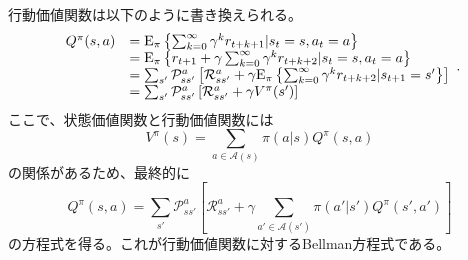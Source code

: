 \documentclass[dvipdfmx, 9pt, a4paper]{jsarticle}
\numberwithin{equation}{section}
\begin{document}
行動価値関数は以下のように書き換えられる。
\begin{equation}
\begin{array}{ll}
Q^\pi(s, a)&={\rm E}_\pi\left\{ \sum_{k=0}^\infty \gamma^kr_{t+k+1}|s_t=s, a_t=a \right\} \\
 & = {\rm E}_\pi\left\{ r_{t+1} + \gamma\sum_{k=0}^\infty \gamma^kr_{t+k+2}|s_t=s, a_t=a \right\} \\
 & = \sum_{s'}\mathcal{P}^a_{ss'}\left[\mathcal{R}^a_{ss'} + \gamma {\rm E}_\pi\left\{ \sum_{k=0}^\infty \gamma^kr_{t+k+2}|s_{t+1}=s' \right\}\right] \\
 & = \sum_{s'}\mathcal{P}^a_{ss'}\left[\mathcal{R}^a_{ss'} + \gamma V^\pi(s')\right]
\end{array}. \notag
\end{equation}
ここで、状態価値関数と行動価値関数には
\begin{equation}
V^\pi(s)=\sum_{a \in \mathcal{A}(s)}\pi(a|s)Q^\pi(s, a)
\end{equation}
の関係があるため、最終的に
\begin{equation}
Q^\pi(s, a)=\sum_{s'}\mathcal{P}^a_{ss'}\left[\mathcal{R}^a_{ss'} + \gamma \sum_{a' \in \mathcal{A}(s')}\pi(a'|s')Q^\pi(s', a')\right]
\end{equation}
の方程式を得る。これが行動価値関数に対するBellman方程式である。
\end{document}
